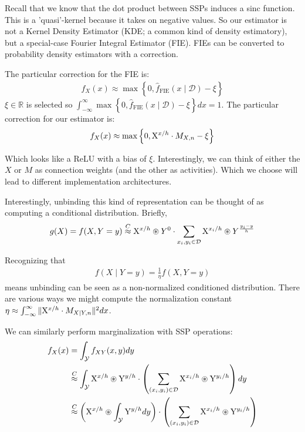 \documentclass[10pt,letterpaper,oneside]{article}
\newcommand{\bind}{\circledast}
\newcommand{\analog}{\overset{C}{\approx}}
\newcommand{\domain}[1]{\mathcal{#1}}
\newcommand{\ssp}[1]{\mathrm{\uppercase{#1}}^{\lowercase{#1}/h}}
\newcommand{\sspi}[2]{\mathrm{\uppercase{#1}}^{\lowercase{#1}_{#2}/h}}
\begin{document}
Recall that we know that the dot product between SSPs induces a sinc function.  This is a 'quasi'-kernel because it takes on negative values. So our estimator is not a Kernel Density Estimator (KDE; a common kind of density estimatory), but a special-case Fourier Integral Estimator (FIE). FIEs can be converted to probability density estimators with a correction.

The particular correction for the FIE is:
\begin{align}
  f_{X}(x) \approx \max\left\{0,\hat{f}_\mathrm{FIE}\left(x \mid \mathcal{D}\right)-\xi\right\}
\end{align}
$\xi\in \mathbb{R}$ is selected so $\int_{-\infty}^{\infty}\max\left\{0,\hat{f}_\mathrm{FIE}\left(x \mid \mathcal{D}\right)-\xi\right\}dx = 1$. The particular correction for our estimator is: 
\begin{align}
  f_{X}(x) \approx \max\left\{0,\ssp{x}\cdot M_{X,n} - \xi\right\}
\end{align}

Which looks like a ReLU with a bias of $\xi$. Interestingly, we can think of either the $X$ or $M$ as connection weights (and the other as activities). Which we choose will lead to different implementation architectures.

Interestingly, unbinding this kind of representation can be thought of as computing a conditional distribution.  Briefly, 
\begin{align}
  g(X) = f(X,Y=y) \analog \ssp{x}\bind Y^{0}\cdot \sum_{x_i,y_i \in \mathcal{D}} \sspi{x}{i}\bind Y^{\frac{y_{i}-y}{h}}
\end{align}

Recognizing that 
\begin{align}
  f(X\mid Y=y) = \frac{1}{\eta}f(X,Y=y)
\end{align}
means unbinding can be seen as a non-normalized conditioned distribution. There are various ways we might compute the normalization constant $\eta \approx \int_{-\infty}^{\infty}\|\ssp{X}\cdot M_{X\mid Y,n}\|^{2} dx$.

We can similarly perform marginalization with SSP operations:
\begin{align}
  f_{X}(x) &= \int_{\domain{Y}}f_{XY}(x,y)dy \\
  &\analog \int_{\domain{Y}}\ssp{X}\bind\ssp{Y} \cdot \left(\sum_{(x_{i},y_{i}) \in \mathcal{D}}\sspi{X}{i}\bind\sspi{Y}{i}\right)dy \\
  &\analog \left(\ssp{X}\bind\int_{\domain{Y}}\ssp{Y}dy\right) \cdot \left(\sum_{(x_{i},y_{i}) \in \mathcal{D}}\sspi{X}{i}\bind\sspi{Y}{i}\right)
\end{align}
\end{document}
